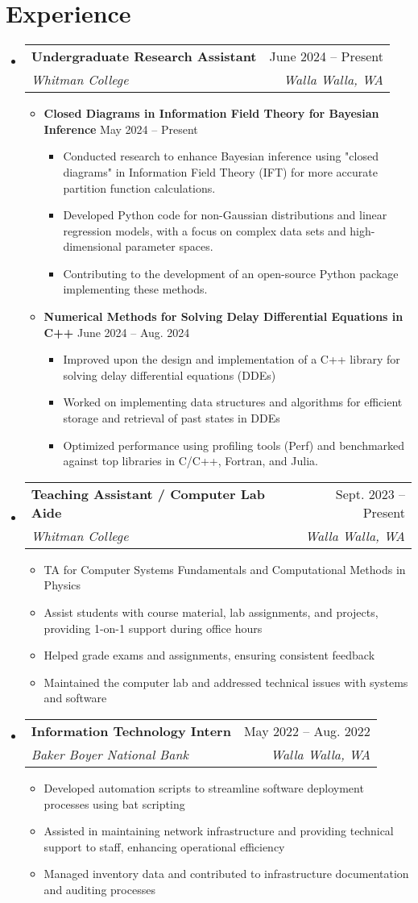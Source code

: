 \documentclass[letterpaper,11pt]{article}
\makeatletter
\newcommand{\resumeItem}[1]{\item\small{#1 \vspace{-2pt}}}
\newcommand{\resumeSubheading}[4]{
  \vspace{-2pt}\item
    \begin{tabular*}{0.97\textwidth}[t]{l@{\extracolsep{\fill}}r}
      \textbf{#1} & #2 \\
      \textit{\small#3} & \textit{\small #4} \\
    \end{tabular*}\vspace{-7pt}
}
\newcommand{\resumeSubHeadingListStart}{\begin{itemize}[leftmargin=0.15in, label={}]}
\newcommand{\resumeSubHeadingListEnd}{\end{itemize}}
\newcommand{\resumeItemListStart}{\begin{itemize}}
\newcommand{\resumeItemListEnd}{\end{itemize}\vspace{-5pt}}
\makeatother
\begin{document}
\section{Experience}
  \resumeSubHeadingListStart
    \resumeSubheading
      {Undergraduate Research Assistant}{June 2024 -- Present}
      {Whitman College}{Walla Walla, WA}
      \resumeItemListStart
        \resumeItem{\textbf{Closed Diagrams in Information Field Theory for Bayesian Inference}}\hspace{0.85 in} {May 2024 -- Present}
        \resumeItemListStart
            \resumeItem{Conducted research to enhance Bayesian inference using "closed diagrams" in Information Field Theory (IFT) for more accurate partition function calculations.}
            \resumeItem{Developed Python code for non-Gaussian distributions and linear regression models, with a focus on complex data sets and high-dimensional parameter spaces.}
            \resumeItem{Contributing to the development of an open-source Python package implementing these methods.}
        \resumeItemListEnd
        \resumeItem{\textbf{Numerical Methods for Solving Delay Differential Equations in C++} \hspace{0.55 in} {June 2024 -- Aug. 2024}}
        \resumeItemListStart
            \resumeItem{Improved upon the design and implementation of a C++ library for solving delay differential equations (DDEs)}
            \resumeItem{Worked on implementing data structures and algorithms for efficient storage and retrieval of past states in DDEs}
            \resumeItem{Optimized performance using profiling tools (Perf) and benchmarked against top libraries in C/C++, Fortran, and Julia.}
        \resumeItemListEnd

      \resumeItemListEnd

    \resumeSubheading
    {Teaching Assistant / Computer Lab Aide}{Sept. 2023 -- Present}
    {Whitman College}{Walla Walla, WA}
    \resumeItemListStart
        \resumeItem{TA for Computer Systems Fundamentals and Computational Methods in Physics}
        \resumeItem{Assist students with course material, lab assignments, and projects, providing 1-on-1 support during office hours}
        \resumeItem{Helped grade exams and assignments, ensuring consistent feedback}
        \resumeItem{Maintained the computer lab and addressed technical issues with systems and software}
    \resumeItemListEnd

    \resumeSubheading
    {Information Technology Intern}{May 2022 -- Aug. 2022}
    {Baker Boyer National Bank}{Walla Walla, WA}
    \resumeItemListStart
      \resumeItem{Developed automation scripts to streamline software deployment processes using bat scripting}
      \resumeItem{Assisted in maintaining network infrastructure and providing technical support to staff, enhancing operational efficiency}
      \resumeItem{Managed inventory data and contributed to infrastructure documentation and auditing processes}
    \resumeItemListEnd
  \resumeSubHeadingListEnd
\end{document}
